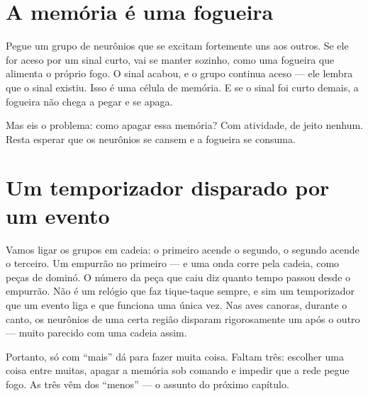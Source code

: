 
\section*{A memória é uma fogueira}

Pegue um grupo de neurônios que se excitam fortemente uns aos outros. Se ele for aceso por um sinal curto, vai se manter sozinho, como uma fogueira que alimenta o próprio fogo. O sinal acabou, e o grupo continua aceso --- ele lembra que o sinal existiu. Isso é uma célula de memória. E se o sinal foi curto demais, a fogueira não chega a pegar e se apaga.

Mas eis o problema: como apagar essa memória? Com atividade, de jeito nenhum. Resta esperar que os neurônios se cansem e a fogueira se consuma.

\section*{Um temporizador disparado por um evento}

Vamos ligar os grupos em cadeia: o primeiro acende o segundo, o segundo acende o terceiro. Um empurrão no primeiro --- e uma onda corre pela cadeia, como peças de dominó. O número da peça que caiu diz quanto tempo passou desde o empurrão. Não é um relógio que faz tique-taque sempre, e sim um temporizador que um evento liga e que funciona uma única vez. Nas aves canoras, durante o canto, os neurônios de uma certa região disparam rigorosamente um após o outro --- muito parecido com uma cadeia assim.

Portanto, só com ``mais'' dá para fazer muita coisa. Faltam três: escolher uma coisa entre muitas, apagar a memória sob comando e impedir que a rede pegue fogo. As três vêm dos ``menos'' --- o assunto do próximo capítulo.

